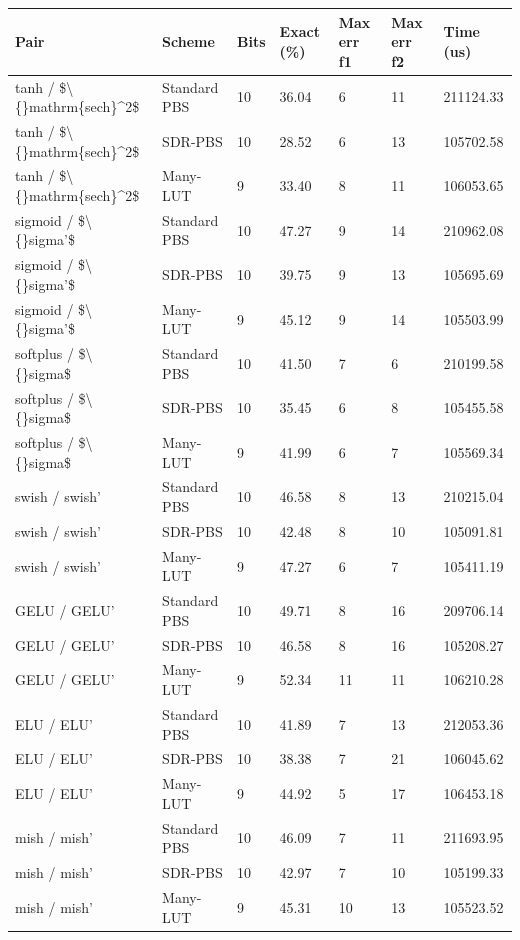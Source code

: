 \small
\setlength{\tabcolsep}{4pt}
\begin{tabular}{lllllll}
\toprule
Pair & Scheme & Bits & Exact (\%) & Max err f1 & Max err f2 & Time (us) \\
\midrule
tanh / \$\textbackslash\{\}mathrm\{sech\}^2\$ & Standard PBS & 10 & 36.04 & 6 & 11 & 211124.33 \\
tanh / \$\textbackslash\{\}mathrm\{sech\}^2\$ & SDR-PBS & 10 & 28.52 & 6 & 13 & 105702.58 \\
tanh / \$\textbackslash\{\}mathrm\{sech\}^2\$ & Many-LUT & 9 & 33.40 & 8 & 11 & 106053.65 \\
sigmoid / \$\textbackslash\{\}sigma'\$ & Standard PBS & 10 & 47.27 & 9 & 14 & 210962.08 \\
sigmoid / \$\textbackslash\{\}sigma'\$ & SDR-PBS & 10 & 39.75 & 9 & 13 & 105695.69 \\
sigmoid / \$\textbackslash\{\}sigma'\$ & Many-LUT & 9 & 45.12 & 9 & 14 & 105503.99 \\
softplus / \$\textbackslash\{\}sigma\$ & Standard PBS & 10 & 41.50 & 7 & 6 & 210199.58 \\
softplus / \$\textbackslash\{\}sigma\$ & SDR-PBS & 10 & 35.45 & 6 & 8 & 105455.58 \\
softplus / \$\textbackslash\{\}sigma\$ & Many-LUT & 9 & 41.99 & 6 & 7 & 105569.34 \\
swish / swish' & Standard PBS & 10 & 46.58 & 8 & 13 & 210215.04 \\
swish / swish' & SDR-PBS & 10 & 42.48 & 8 & 10 & 105091.81 \\
swish / swish' & Many-LUT & 9 & 47.27 & 6 & 7 & 105411.19 \\
GELU / GELU' & Standard PBS & 10 & 49.71 & 8 & 16 & 209706.14 \\
GELU / GELU' & SDR-PBS & 10 & 46.58 & 8 & 16 & 105208.27 \\
GELU / GELU' & Many-LUT & 9 & 52.34 & 11 & 11 & 106210.28 \\
ELU / ELU' & Standard PBS & 10 & 41.89 & 7 & 13 & 212053.36 \\
ELU / ELU' & SDR-PBS & 10 & 38.38 & 7 & 21 & 106045.62 \\
ELU / ELU' & Many-LUT & 9 & 44.92 & 5 & 17 & 106453.18 \\
mish / mish' & Standard PBS & 10 & 46.09 & 7 & 11 & 211693.95 \\
mish / mish' & SDR-PBS & 10 & 42.97 & 7 & 10 & 105199.33 \\
mish / mish' & Many-LUT & 9 & 45.31 & 10 & 13 & 105523.52 \\
\bottomrule
\end{tabular}
